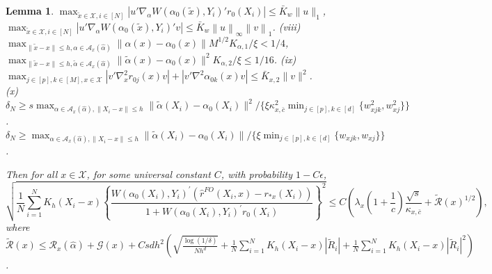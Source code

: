 \documentclass[11pt]{article}
\newtheorem{lemma}{Lemma}
\newcommand{\norm}[1]{\left\lVert #1 \right\rVert}
\begin{document}
\begin{lemma}
${\displaystyle\max_{\tilde{x}\in\mathcal{X},i\in[N]}}|u'\nabla_{\alpha}W(\alpha_0(\tilde{x}),Y_i)'r_0(X_i)|\leq\bar{K}_w\|u\|_1$, ${\displaystyle\max_{\tilde{x}\in\mathcal{X},i\in[N]}}|u'\nabla_{\alpha}W(\alpha_0(\tilde{x}),Y_i)'v|\leq \bar{K}_w\norm{u}_{\infty}\norm{v}_{1}$. (viii) ${\displaystyle\max_{\|\tilde{x}-x\|\leq h, \alpha \in \mathcal{A}_x(\hat\alpha)}}\|\alpha(x)-\alpha_0(x)\|M^{1/2}K_{\alpha,1}/\xi < 1/4$, ${\displaystyle\max_{\|\tilde{x}-x\|\leq h, \tilde\alpha \in \mathcal{A}_x(\hat\alpha)}}\|\tilde \alpha(x)-\alpha_0(x)\|^2 K_{\alpha,2}/\xi \leq 1/16$. 
(ix) ${\displaystyle\max_{j\in [p], k\in[M], x\in \mathcal{X}}}|v'\nabla_{x}^2 r_{0j}(x)v|+ |v'\nabla^2\alpha_{0k}(x)v|\leq \bar{K}_{x,2}\|v\|^2$. \\
(x) $\delta_N\geq s{\displaystyle\max_{\alpha \in \mathcal{A}_x(\hat\alpha), \|X_i-x\|\leq h}}\|\tilde\alpha(X_i)-\alpha_0(X_i)\|^2/ \{\xi\kappa_{x,\bar c}^2{\displaystyle\min_{j\in[p], k\in[d]}}\{w_{xjk}^2,w_{xj}^2\}\}$. \\
$\delta_N\geq{\displaystyle\max_{\alpha \in \mathcal{A}_x(\hat\alpha), \|X_i-x\|\leq h}}\|\tilde\alpha(X_i)-\alpha_0(X_i)\|/ \{\xi{\displaystyle\min_{j\in[p], k\in[d]}}\{w_{xjk},w_{xj}\}\}$. 

Then for all $x \in \mathcal{X}$, for some universal constant $C$, with probability $1-C\epsilon$, 
$$\sqrt{\frac{1}{N} \sum_{i=1}^NK_h(X_i-x)\left\{\frac{W(\alpha_0(X_i),Y_i)^\prime(\hat{r}^{FO}(X_i,x)-r_{*x}(X_i))}{1+W(\alpha_0(X_i),Y_i)^\prime r_0(X_i)}\right\}^2}\leq C\left(\lambda_x \left( 1 + \frac{1}{c}\right) \frac{\sqrt{s}}{\kappa_{x,\bar{c}}} + \widetilde{\mathcal{R}}(x)^{1/2}\right),$$
where $\displaystyle\widetilde{\mathcal{R}}(x)\leq \mathcal{R}_x(\hat\alpha) + \mathcal{G}(x) + Csdh^2\left(\!\!\sqrt{\frac{\log(1/\delta)}{Nh^d}}\! + \! \frac{1}{N}\sum_{i=1}^NK_h(X_i-x)|\widetilde{R}_i|\!+\!\frac{1}{N}\sum_{i=1}^NK_h(X_i-x)|\widetilde{R}_i|^2\right)$.
\end{lemma}
\end{document}
